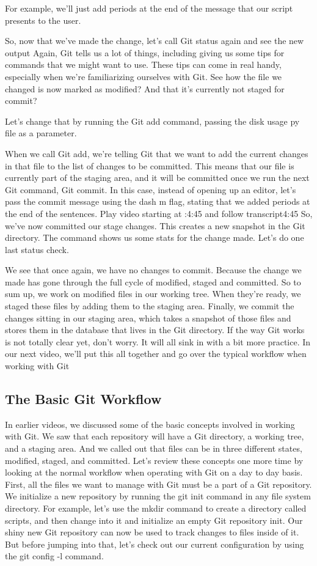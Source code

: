 	For example, we'll just add periods at the end of the message that our script presents to the user.
	
	So, now that we've made the change, let's call Git status again and see the new output Again, Git tells us a lot of things, including giving us some tips for commands that we might want to use. These tips can come in real handy, especially when we're familiarizing ourselves with Git. See how the file we changed is now marked as modified? And that it's currently not staged for commit?
	
	Let's change that by running the Git add command, passing the disk usage py file as a parameter.
	
	When we call Git add, we're telling Git that we want to add the current changes in that file to the list of changes to be committed. This means that our file is currently part of the staging area, and it will be committed once we run the next Git command, Git commit. In this case, instead of opening up an editor, let's pass the commit message using the dash m flag, stating that we added periods at the end of the sentences.
	Play video starting at :4:45 and follow transcript4:45
	So, we've now committed our stage changes. This creates a new snapshot in the Git directory. The command shows us some stats for the change made. Let's do one last status check.
	
	We see that once again, we have no changes to commit. Because the change we made has gone through the full cycle of modified, staged and committed. So to sum up, we work on modified files in our working tree. When they're ready, we staged these files by adding them to the staging area. Finally, we commit the changes sitting in our staging area, which takes a snapshot of those files and stores them in the database that lives in the Git directory. If the way Git works is not totally clear yet, don't worry. It will all sink in with a bit more practice. In our next video, we'll put this all together and go over the typical workflow when working with Git
	
	\subsection{The Basic Git Workflow}
	
	
	In earlier videos, we discussed some of the basic concepts involved in working with Git. We saw that each repository will have a Git directory, a working tree, and a staging area. And we called out that files can be in three different states, modified, staged, and committed. Let's review these concepts one more time by looking at the normal workflow when operating with Git on a day to day basis. First, all the files we want to manage with Git must be a part of a Git repository. We initialize a new repository by running the git init command in any file system directory. For example, let's use the mkdir command to create a directory called scripts, and then change into it and initialize an empty Git repository init. Our shiny new Git repository can now be used to track changes to files inside of it. But before jumping into that, let's check out our current configuration by using the git config -l command.
	
